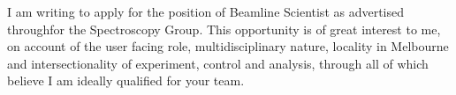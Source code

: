 \documentclass[10pt,a4paper,ragged2e,withhyper,paragraphstrue]{altacv}
\newcommand{\pind}{\hspace{24pt}}
\begin{document}
{	%



	\pind I am writing to apply for the position of Beamline Scientist as advertised throughfor the Spectroscopy Group. This opportunity is of great interest to me, on account of the user facing role, multidisciplinary nature, locality in Melbourne and intersectionality of experiment, control and analysis, through all of which believe I am ideally qualified for your team. 

}
\end{document}
